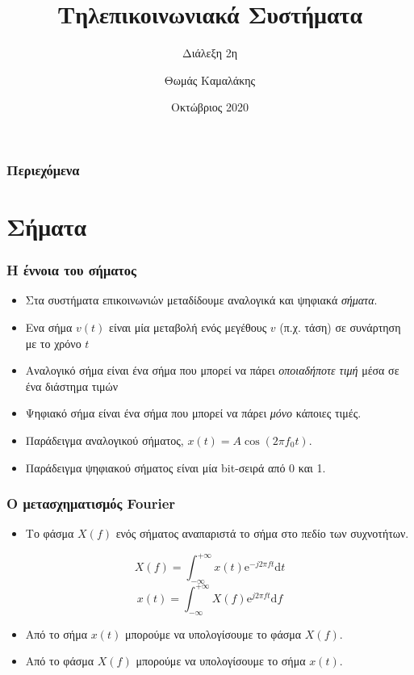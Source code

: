 \documentclass[9pt]{beamer}
\title{Τηλεπικοινωνιακά Συστήματα}
\subtitle{Διάλεξη 2η}
\author{Θωμάς Καμαλάκης}
\institute{Χαροκόπειο Πανεπιστήμιο Αθηνών}
\date{Οκτώβριος 2020}
\begin{document}
	\begin{frame}
	\titlepage
	\end{frame}
	\begin{frame}
	\frametitle{Περιεχόμενα}
	\tableofcontents
	\end{frame}
	\section{Σήματα}
	\begin{frame}
	\frametitle{Η έννοια του σήματος}
	\begin{itemize}
	\item Στα συστήματα επικοινωνιών μεταδίδουμε αναλογικά και ψηφιακά \emph{σήματα}.
	\item Ενα σήμα $v(t)$ είναι μία μεταβολή ενός μεγέθους $v$ (π.χ. τάση) σε συνάρτηση με το χρόνο $t$ 
	\item Αναλογικό σήμα είναι ένα σήμα που μπορεί να πάρει \emph{οποιαδήποτε τιμή} μέσα σε ένα διάστημα τιμών
	\item Ψηφιακό σήμα είναι ένα σήμα που μπορεί να πάρει \emph{μόνο} κάποιες τιμές.
	\item Παράδειγμα αναλογικού σήματος, $x(t) = A\cos(2\pi f_0t)$.	
	\item Παράδειγμα ψηφιακού σήματος είναι μία bit-σειρά από 0 και 1.	
	\end{itemize}
	\end{frame}
	\begin{frame}
	\frametitle{Ο μετασχηματισμός Fourier}
	\begin{itemize}
		\item Το φάσμα $X(f)$ ενός σήματος αναπαριστά το σήμα στο πεδίο των συχνοτήτων.		
	\end{itemize}
	\begin{equation}
	X(f) = \int_{-\infty}^{+\infty}x(t)\mathrm{e}^{-j2\pi ft}\mathrm{d}t
	\end{equation}	
	\begin{equation}
	x(t) = \int_{-\infty}^{+\infty}X(f)\mathrm{e}^{j2\pi ft}\mathrm{d}f
	\end{equation}	
	\begin{itemize}
	\item Από το σήμα $x(t)$ μπορούμε να υπολογίσουμε το φάσμα $X(f)$.
	\item Από το φάσμα $X(f)$ μπορούμε να υπολογίσουμε το σήμα $x(t)$.
	\end{itemize}	
	\end{frame}
\end{document}
